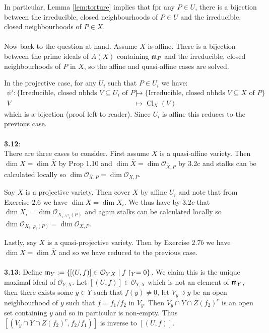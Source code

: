 \documentclass[12pt]{article}
\numberwithin{thm}{subsection}
\numberwithin{defn}{subsection}
\numberwithin{lemma}{subsection}
\numberwithin{example}{subsection}
\numberwithin{notation}{subsection}
\numberwithin{cor}{subsection}
\numberwithin{remark}{subsection}
\numberwithin{condition}{subsection}
\numberwithin{question}{subsection}
\numberwithin{construction}{subsection}
\numberwithin{construction}{subsection}
\numberwithin{construction}{subsection}
\newcommand{\call}[1]{\mathcal{#1}}
\begin{document}
In particular, Lemma \ref{lem:torture} implies that fpr any $P \in U$, there is a bijection between the irreducible, closed neighbourhoods of $P \in U$ and the irreducible, closed neighbourhoods of $P \in X$.\\\\
%
Now back to the question at hand. Assume $X$ is affine. There is a bijection between the prime ideals of $A(X)$ containing $\frak{m}_P$ and the irreducible, closed neighbourhoods of $P$ in $X$, so the affine and quasi-affine cases are solved.

In the projective case, for any $U_i$ such that $P \in U_i$ we have:
\begin{align*}
    \psi': \lbrace \text{Irreducible, closed nbhds }V \subseteq U_i\text{ of }P\rbrace &\to \lbrace \text{Irreducible, closed nbhds }V \subseteq X\text{ of }P\rbrace\\
    V &\mapsto \operatorname{Cl}_X(V)
\end{align*}
which is a bijection (proof left to reader). Since $U_i$ is affine this reduces to the previous case.\\\\
%
\textbf{3.12}:\\
There are three cases to consider. First assume $X$ is a quasi-affine variety. Then $\operatorname{dim}X = \operatorname{dim}\bar{X}$ by Prop 1.10 and $\operatorname{dim}\bar{X} = \operatorname{dim}\call{O}_{\bar{X},P}$ by 3.2c and stalks can be calculated locally so $\operatorname{dim}\call{O}_{\bar{X},P} = \operatorname{dim}\call{O}_{X,P}$.

Say $X$ is a projective variety. Then cover $X$ by affine $U_i$ and note that from Exercise $2.6$ we have $\operatorname{dim}X = \operatorname{dim}X_i$. We thus have by $3.2c$ that $\operatorname{dim}X_i = \operatorname{dim}\call{O}_{X_i,\varphi_{i}(P)}$ and again stalks can be calculated locally so $\operatorname{dim}\call{O}_{X_i,\varphi_i(P)} = \operatorname{dim}\call{O}_{X,P}$.

Lastly, say $X$ is a quasi-projective variety. Then by Exercise $2.7b$ we have $\operatorname{dim}X = \operatorname{dim}\bar{X}$ and so we have reduced to the previous case.\\\\
%
\textbf{3.13}: Define $\frak{m}_Y := \lbrace [(U,f)] \in \call{O}_{Y,X} \mid f\restriction_Y = 0\rbrace$. We claim this is the unique maximal ideal of $\call{O}_{Y,X}$. Let $[(U,f)] \in \call{O}_{Y,X}$ which is not an element of $\frak{m}_Y$, then there exists some $y \in Y$ such that $f(y) \neq 0$, let $V_y \ni y$ be an open neighbourhood of $y$ such that $f = f_1/f_2$ in $V_y$. Then $V_y \cap Y \cap Z(f_2)^c$ is an open set containing $y$ and so in particular is non-empty. Thus $[(V_y \cap Y \cap Z(f_2)^c, f_2/f_1)]$ is inverse to $[(U,f)]$.
\end{document}
